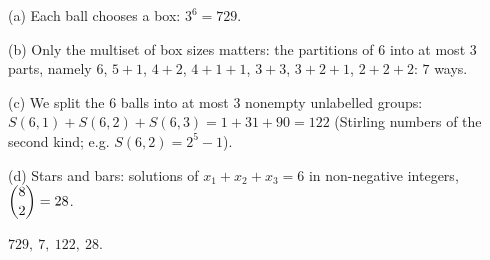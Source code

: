 (a) Each ball chooses a box: $3^6=729$.

(b) Only the multiset of box sizes matters: the partitions of $6$ into at most $3$ parts, namely $6$, $5+1$, $4+2$, $4+1+1$, $3+3$, $3+2+1$, $2+2+2$: $7$ ways.

(c) We split the $6$ balls into at most $3$ nonempty unlabelled groups: $S(6,1)+S(6,2)+S(6,3)=1+31+90=122$ (Stirling numbers of the second kind; e.g. $S(6,2)=2^5-1$).

(d) Stars and bars: solutions of $x_1+x_2+x_3=6$ in non-negative integers, $\dbinom82=28$.

$\boxed{729,\ 7,\ 122,\ 28}$.
